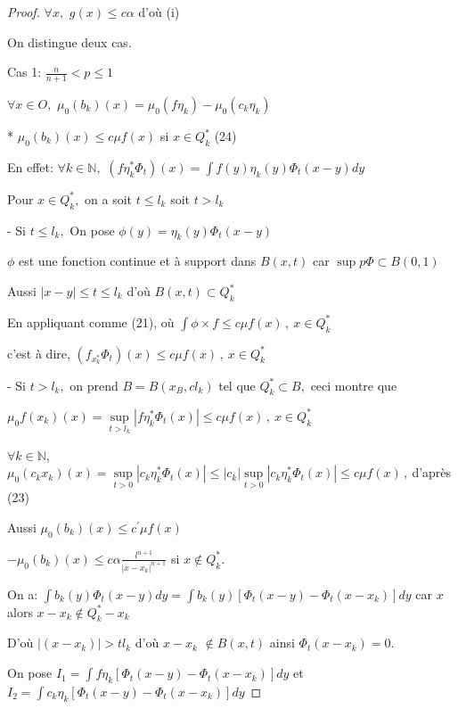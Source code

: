 \documentclass[12pt, a4paper, oneside]{article}
\begin{document}
\begin{proof}
	$\forall x,$ $g(x)\leq c\alpha $ d'où (i)
	
	On distingue deux cas.
	
	Cas 1: $\frac{n}{n+1}<p\leq 1$
	
	$\forall x\in O,$ $\mu _{0}(b_{k})(x)=\mu _{0}(f\eta _{k})-\mu
	_{0}(c_{k}\eta _{k})$
	
	* $\mu _{0}(b_{k})(x)\leq c\mu f(x)$ si $x\in Q_{k}^{\ast }$ (24)
	
	En effet: $\forall k\in \mathbb{N},$ $(f\eta _{k}^{\ast }\Phi _{t})(x)=\int f(y)\eta _{k}(y)\Phi _{t}(x-y)dy$
	
	Pour $x\in Q_{k}^{\ast },$ on a soit $t\leq l_{k}$ soit $t>l_{k}$
	
	- Si $t\leq l_{k},$ On pose $\phi (y)=\eta _{k}(y)\Phi _{t}(x-y)$
	
	$\phi $ est une fonction continue et à support dans $B(x,t)$ car $\sup
	p\Phi \subset B(0,1)$
	
	Aussi $\left\vert x-y\right\vert \leq t\leq l_{k}$ d'où $B(x,t)\subset
	Q_{k}^{\ast }$
	
	En appliquant comme (21), où $\int \phi \times f\leq c\mu f(x)\,,~x\in
	Q_{k}^{\ast }$
	
	c'est à dire, $(f_{x_{k}^{\ast }}\Phi _{t})(x)\leq c\mu f(x)\,,~x\in
	Q_{k}^{\ast }$
	
	- Si $t>l_{k},$ on prend $B=B(x_{B},cl_{k})$ tel que  $Q_{k}^{\ast }\subset
	B,$ ceci montre que 
	
	$\mu _{0}f(x_{k})(x)=\underset{t>l_{k}}{\sup }\left\vert f\eta _{k}^{\ast
	}\Phi _{t}(x)\right\vert \leq c\mu f(x)\,,~x\in Q_{k}^{\ast }$
	
	$\forall k\in \mathbb{N}$, $\mu _{0}(c_{k}x_{k})(x)=\underset{t>0}{\sup }\left\vert c_{k}\eta
	_{k}^{\ast }\Phi _{t}(x)\right\vert \leq \left\vert c_{k}\right\vert 
	\underset{t>0}{\sup }\left\vert c_{k}\eta _{k}^{\ast }\Phi
	_{t}(x)\right\vert \leq c\mu f(x)\,,~$d'après (23)
	
	Aussi $\mu _{0}(b_{k})(x)\leq c^{\prime }\mu f(x)\,$
	
	$-\mu _{0}(b_{k})(x)\leq c\alpha \frac{l^{n+1}}{\left\vert
		x-x_{k}\right\vert ^{n+1}}$ si $x\notin Q_{k}^{\ast }.$
	
	On a: $\int b_{k}(y)\Phi _{t}(x-y)dy=\int b_{k}(y)[\Phi _{t}(x-y)-\Phi
	_{t}(x-x_{k})]dy$ car $x$ alors $x-x_{k}\notin Q_{k}^{\ast }-x_{k}$
	
	D'où $\left\vert (x-x_{k})\right\vert >tl_{k}$ d'où $x-x_{k}$ $
	\notin B(x,t)$ ainsi $\Phi _{t}(x-x_{k})=0.$
	
	On pose $I_{1}=\int f\eta _{k}[\Phi _{t}(x-y)-\Phi _{t}(x-x_{k})]dy$ et $
	I_{2}=\int c_{k}\eta _{k}[\Phi _{t}(x-y)-\Phi _{t}(x-x_{k})]dy$ 
	

\end{proof}
\end{document}
